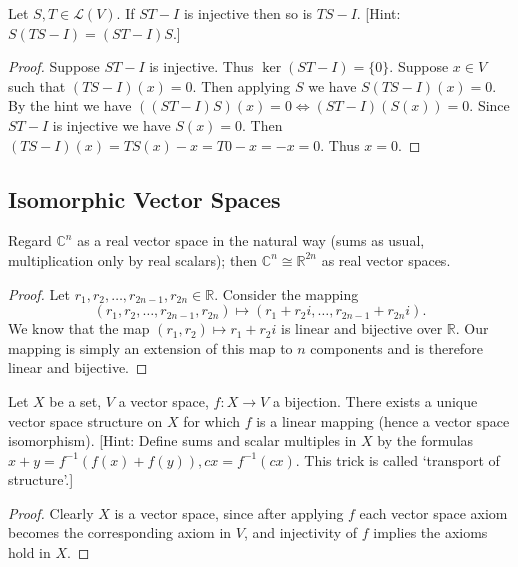 \begin{tcolorbox}[title=Problem 26, breakable]
    Let $S, T \in \mathcal{L}(V)$. If $ST - I$ is injective then so is $TS - I$. [Hint: $S(TS - I) = (ST - I)S$.]
\end{tcolorbox}

\begin{proof}
    Suppose $ST - I$ is injective.
    Thus $\ker (ST - I) = \{0\}$.
    Suppose $x \in V$ such that $(TS - I)(x) = 0$.
    Then applying $S$ we have $S(TS - I)(x) = 0$.
    By the hint we have $((ST - I)S)(x) = 0 \iff (ST - I)(S(x)) = 0$.
    Since $ST - I$ is injective we have $S(x) = 0$.
    Then $(TS - I)(x) = TS(x) - x = T0 - x = -x = 0$.
    Thus $x = 0$.
\end{proof}

\subsection{Isomorphic Vector Spaces}

\begin{tcolorbox}[title=Problem 2, breakable]
    Regard $\mathbb{C}^n$ as a real vector space 
    in the natural way (sums as usual, multiplication 
    only by real scalars); 
    then $\mathbb{C}^n \cong \mathbb{R}^{2n}$
    as real vector spaces.
\end{tcolorbox}

\begin{proof}
    Let $r_1, r_2, \ldots, r_{2n-1}, r_{2n} \in \mathbb{R}$.
    Consider the mapping
    \[
    (r_1, r_2, \ldots, r_{2n-1}, r_{2n})
    \mapsto
    (r_1 + r_2 i, \ldots, r_{2n-1} + r_{2n} i).
    \]
    We know that the map $(r_1, r_2) \mapsto r_1 + r_2 i$ is linear and bijective
    over $\mathbb{R}$.
    Our mapping is simply an extension of this map to $n$ components and is therefore
    linear and bijective.
\end{proof}

\begin{tcolorbox}[title=Problem 3, breakable]
    Let $X$ be a set, $V$ a vector space, $f : X \longrightarrow V$ a bijection.
    There exists a unique vector space structure on $X$ for which $f$ is a linear mapping 
    (hence a vector space isomorphism).
    [Hint: Define sums and scalar multiples in $X$ by the formulas $x + y = f^{-1}(f(x) + f(y)), cx = f^{-1}(cx)$.
    This trick is called `transport of structure'.]
\end{tcolorbox}

\begin{proof}
    Clearly $X$ is a vector space, since after applying $f$ each vector space axiom
    becomes the corresponding axiom in $V$, and injectivity of $f$ implies the axioms
    hold in $X$.
\end{proof}

